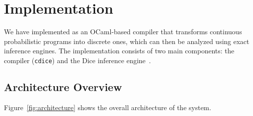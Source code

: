 \documentclass[acmsmall,screen,dvipsnames,x11names,nonacm,anonymous,review]{acmart}
\begin{document}
\section{Implementation}\label{sec:implementation}

We have implemented \Slice{} as an OCaml-based compiler that transforms continuous probabilistic programs into discrete ones, which can then be analyzed using exact inference engines. The implementation consists of two main components: the \Slice{} compiler (\texttt{cdice}) and the Dice inference engine~\cite{Holtzen2020Dice}.

\subsection{Architecture Overview}

Figure~\ref{fig:architecture} shows the overall architecture of the \Slice{} system.
\end{document}
